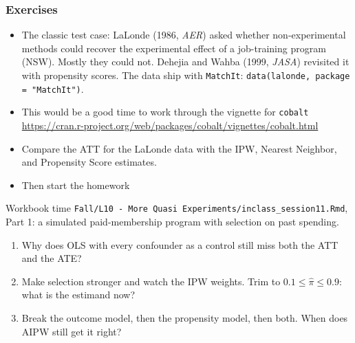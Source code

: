 \documentclass[aspectratio=169,11pt]{beamer}
\begin{document}
\begin{frame}
\frametitle{Exercises}
\begin{itemize}
\item The classic test case: LaLonde (1986, \emph{AER}) asked whether non-experimental methods could recover the
experimental effect of a job-training program (NSW). Mostly they could not. Dehejia and Wahba (1999, \emph{JASA})
revisited it with propensity scores. The data ship with \texttt{MatchIt}: \texttt{data(lalonde, package = "MatchIt")}.
\item This would be a good time to work through the vignette for \texttt{cobalt}
 \url{https://cran.r-project.org/web/packages/cobalt/vignettes/cobalt.html}
 \item Compare the ATT for the LaLonde data with the IPW, Nearest Neighbor, and Propensity Score estimates.
 \item Then start the homework
\end{itemize}
\end{frame}

\begin{frame}{Workbook time}
\texttt{Fall/L10 - More Quasi Experiments/inclass\_session11.Rmd}, Part 1: a simulated paid-membership program
with selection on past spending.
\begin{enumerate}
	\item Why does OLS with every confounder as a control still miss both the ATT and the ATE?
	\item Make selection stronger and watch the IPW weights. Trim to $0.1 \le \hat\pi \le 0.9$: what is the estimand now?
	\item Break the outcome model, then the propensity model, then both. When does AIPW still get it right?
\end{enumerate}
\end{frame}
\end{document}
